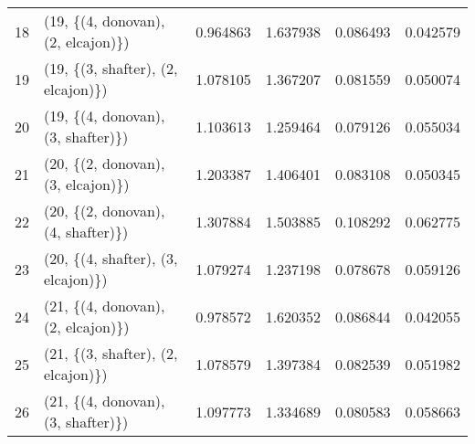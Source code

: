 \begin{tabular}{llrrrr}
18 &  (19, \{(4, donovan), (2, elcajon)\}) &  0.964863 &  1.637938 &   0.086493 &  0.042579 \\
19 &  (19, \{(3, shafter), (2, elcajon)\}) &  1.078105 &  1.367207 &   0.081559 &  0.050074 \\
20 &  (19, \{(4, donovan), (3, shafter)\}) &  1.103613 &  1.259464 &   0.079126 &  0.055034 \\
21 &  (20, \{(2, donovan), (3, elcajon)\}) &  1.203387 &  1.406401 &   0.083108 &  0.050345 \\
22 &  (20, \{(2, donovan), (4, shafter)\}) &  1.307884 &  1.503885 &   0.108292 &  0.062775 \\
23 &  (20, \{(4, shafter), (3, elcajon)\}) &  1.079274 &  1.237198 &   0.078678 &  0.059126 \\
24 &  (21, \{(4, donovan), (2, elcajon)\}) &  0.978572 &  1.620352 &   0.086844 &  0.042055 \\
25 &  (21, \{(3, shafter), (2, elcajon)\}) &  1.078579 &  1.397384 &   0.082539 &  0.051982 \\
26 &  (21, \{(4, donovan), (3, shafter)\}) &  1.097773 &  1.334689 &   0.080583 &  0.058663 \\
\bottomrule
\end{tabular}
